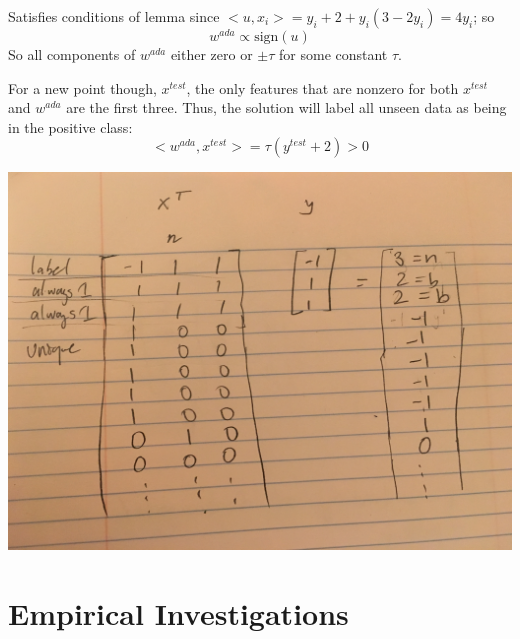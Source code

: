 \documentclass[12pt]{article}
\begin{document}

Satisfies conditions of lemma since $< u, x_i > = y_i + 2 + y_i(3 - 2y_i) = 4y_i$; so
$$w^{ada} \propto \text{sign} (u)$$
So all components of $w^{ada}$ either zero or $\pm \tau$ for some constant $\tau$.

For a new point though, $x^{test}$, the only features that are nonzero for both $x^{test}$ and $w^{ada}$ are the first three.
Thus, the solution will label all unseen data as being in the positive class:
$$< w^{ada}, x^{test} > = \tau ( y^{test} + 2 ) > 0$$

\includegraphics[width=1\textwidth]{infinite}




\newpage

\section{Empirical Investigations}
\end{document}
